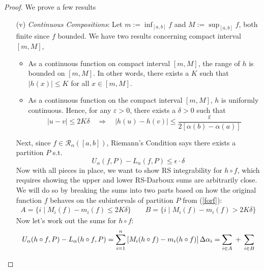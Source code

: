 \documentclass[12pt]{article}
\numberwithin{equation}{section} %
\theoremstyle{plain}
\theoremstyle{definition}
\theoremstyle{remark}
\begin{document}
\begin{proof}
We prove a few results
\begin{enumerate}[label=(\roman*)]
  \item[(v)]
    \emph{Continuous Compositions}:
    Let $m:=\inf_{[a,b]}f$ and $M:=\sup_{[a,b]}f$, both finite since $f$
    bounded. We have two results concerning compact interval $[m,M]$,
    \begin{itemize}
      \item As a continuous function on compact interval $[m,M]$,
        the range of $h$ is bounded on $[m,M]$. In other words, there
        exists a $K$ such that $|h(x)|\leq K$ for all $x\in[m,M]$.
      \item As a continuous function on the compact interval $[m,M]$,
        $h$ is uniformly continuous. Hence, for any $\varepsilon>0$,
        there exists a $\delta>0$ such that
        \begin{equation}
            \label{cont}
              |u- v| \leq 2K\delta \quad \Rightarrow
                \quad |h(u) - h(v)| \leq
                \frac{\varepsilon}{2\left[\alpha(b)-\alpha(a)
                \right]}
        \end{equation}
    \end{itemize}
    Next, since $f \in \mathscr{R}_\alpha([a,b])$, Riemann's Condition
    says there exists a partition $P$ s.t.
    \begin{equation}
        \label{forf}
          U_\alpha(f,P)- L_\alpha(f,P) \leq \epsilon\cdot
            \delta
    \end{equation}
    Now with all pieces in place, we want to show RS integrability for
    $h\circ f$, which requires showing the upper and lower
    RS-Darboux sums are arbitrarily close. We will do so by breaking the
    sums into two parts based on how the original function $f$ behaves
    on the subintervals of partition $P$ from (\ref{forf}):
    \begin{align*}
        A = \{ i \; | \; M_i(f) - m_i(f)\leq2K\delta\}
        \qquad
        B = \{ i \; | \; M_i(f) - m_i(f)>2K\delta\}
    \end{align*}
    Now let's work out the sums for $h\circ f$:
    \begin{align}
        U_\alpha(h\circ f,P) - L_\alpha(h\circ f,P)
            &= \sum^n_{i=1} \left[
            M_i(h\circ f) - m_i(h\circ f)\right]
            \Delta\alpha_i \notag
        = \sum_{i\in A} \; + \;
            \sum_{i\in B} \notag\\

\end{align}
\end{enumerate}
\end{proof}
\end{document}
